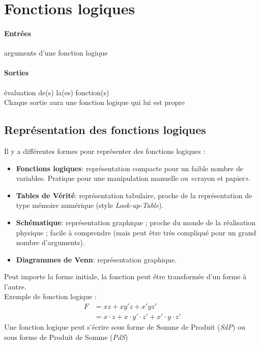 \section{Fonctions logiques}
\paragraph{Entrées} arguments d'une fonction logique
\paragraph{Sorties} évaluation de(s) la(es) fonction(s)\\

Chaque sortie aura une fonction logique qui lui est propre
\subsection{Représentation des fonctions logiques}
Il y a différentes formes pour représenter des fonctions logiques :
\begin{itemize}
	\item \textbf{Fonctions logiques}: représentation compacte pour un faible nombre de variables. Pratique pour une manipulation manuelle ou «crayon et papier».
	\item \textbf{Tables de Vérité}: représentation tabulaire, proche de la représentation de type mémoire numérique (style \textit{Look-up-Table}).
	\item \textbf{Schématique}: représentation graphique ; proche du monde de la réalisation physique ; facile à comprendre (mais peut être très compliqué pour un grand nombre d’arguments).
	\item \textbf{Diagrammes de Venn}: représentation graphique.
\end{itemize}
Peut importe la forme initiale, la fonction peut être transformée d'un forme à l’autre.\\

Exemple de fonction logique :
\begin{align}
F &= xz+xy'z+x'yz'\\
&= x\cdot z+x\cdot y'\cdot z'+x'\cdot y\cdot z'
\end{align}
Une fonction logique peut s'écrire sous forme de Somme de Produit (\textit{SdP}) ou sous forme de Produit de Somme (\textit{PdS})
